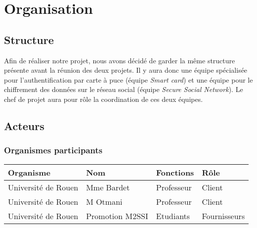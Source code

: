 \documentclass[a4paper,11pt,french]{article}
\begin{document}
\section{Organisation}
\subsection{Structure}
	Afin de réaliser notre projet, nous avons décidé de garder la même
structure présente avant la réunion des deux projets. Il y aura donc une
équipe spécialisée pour l'authentification par carte à puce (équipe 
\emph{Smart card}) et une équipe pour le chiffrement des données sur le
réseau social (équipe \emph{Secure Social Network}). Le chef de projet aura
pour rôle la coordination de ces deux équipes.

\subsection{Acteurs}
\subsubsection{Organismes participants}
\begin{center}
	\begin{tabularx}{16cm}{|X|X|X|X|}
	\hline
	\bfseries{Organisme} & \bfseries{Nom} & \bfseries{Fonctions} & \bfseries{Rôle}\\
	\hline
	Université de Rouen & Mme Bardet & Professeur & Client\\
	\hline
	Université de Rouen & M Otmani & Professeur & Client\\
	\hline
	Université de Rouen & Promotion M2SSI & Etudiants & Fournisseurs\\
	\hline
	\end{tabularx}
\end{center}
\vspace*{0cm}
\end{document}
